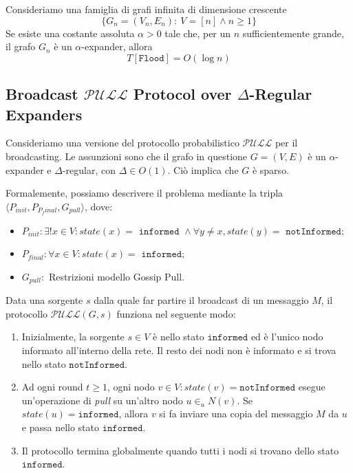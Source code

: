 \begin{lemma}
    Consideriamo una famiglia di grafi infinita di dimensione crescente
    \[
        \{ G_n=(V_n, E_n):\ V=[n] \land n \geq 1 \}
    \]
    Se esiste una costante assoluta $\alpha > 0$ tale che, per un $n$ sufficientemente grande, il grafo $G_n$ è un $\alpha$-expander, allora
    \[
        T[\texttt{Flood}] = O(\log n)
    \]
\end{lemma}

\subsection{Broadcast $\mathcal{PULL}$ Protocol over $\Delta$-Regular Expanders}

Consideriamo una versione del protocollo probabilistico $\mathcal{PULL}$ per il broadcasting. Le assunzioni sono che il grafo in questione $G = (V, E)$ è un $\alpha$-expander e $\Delta$-regular, con $\Delta \in O(1)$. Ciò implica che $G$ è sparso.

Formalemente, possiamo descrivere il problema mediante la tripla $\langle P_{init}, P_{P_final}, G_{pull} \rangle$, dove:
\begin{itemize}
    \item $P_{init}: \exists! x \in V: state(x) = \texttt{ informed } \land \forall y \neq x, state (y) = \texttt{ notInformed}$;
    \item $P_{final}: \forall x \in V: state(x) = \texttt{ informed}$;
    \item $G_{pull}:$ Restrizioni modello Gossip Pull.
\end{itemize}

Data una sorgente $s$ dalla quale far partire il broadcast di un messaggio $M$, il protocollo $\mathcal{PULL}(G, s)$ funziona nel seguente modo:

\begin{enumerate}
    \item Inizialmente, la sorgente $s \in V$ è nello stato $\texttt{informed}$ ed è l'unico nodo informato all'interno della rete. Il resto dei nodi non è informato e si trova nello stato $\texttt{notInformed}$.
    \item Ad ogni round $t \geq 1$, ogni nodo $v \in V: state(v) = \texttt{notInformed}$ esegue un'operazione di \textit{pull} su un'altro nodo $u \in_{u} N(v)$. Se $state(u) = \texttt{informed}$, allora $v$ si fa inviare una copia del messaggio $M$ da $u$ e passa nello stato $\texttt{informed}$.
    \item Il protocollo termina globalmente quando tutti i nodi si trovano dello stato $\texttt{informed}$. 
\end{enumerate}

